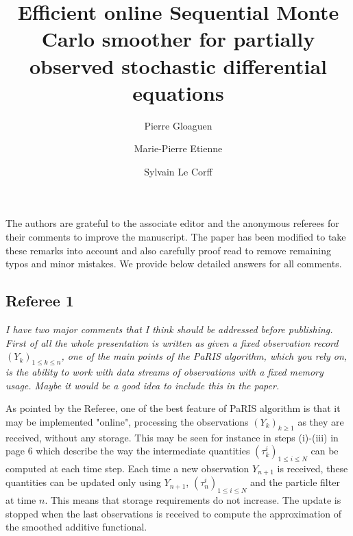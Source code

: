 \documentclass[12pt]{article}
\newcommand{\1}{\mathrm{1}}
\begin{document}
\author{Pierre Gloaguen\footnotemark[1] \and Marie-Pierre Etienne\footnotemark[1] \and Sylvain Le {C}orff\footnotemark[2]}
 


\title{Efficient online Sequential Monte Carlo smoother for partially observed stochastic differential equations}


\maketitle

The authors are grateful to the associate editor and the anonymous referees for their comments to improve the manuscript. The paper has been modified to take these remarks into account and also carefully proof read to remove remaining typos and minor mistakes. We provide below detailed answers for all comments.

\subsection*{Referee 1}
{\em I have two major comments that I think should be addressed before publishing. First of all the whole presentation is written as given a  fixed observation record $(Y_k)_{1\le k \le n}$, one of the main points of the PaRIS algorithm, which you rely on, is the ability to work with data streams of observations with a  fixed memory usage. Maybe it would be a good idea to include this in the paper.}

\vspace{.3cm}

As pointed by the Referee, one of the best feature of PaRIS algorithm is that it may be implemented "online", processing the observations $(Y_k)_{k\ge 1}$ as they are received, without any storage. This may be seen for instance in steps (i)-(iii) in page 6 which describe the way the intermediate quantities $(\tau_k^i)_{1\le i \le N}$ can be computed at each time step. Each time a new observation $Y_{n+1}$ is received, these quantities can be updated only using $Y_{n+1}$, $(\tau_n^i)_{1\le i \le N}$ and the particle filter at time $n$. This means that storage requirements do not increase. The update is stopped when the last observations is received to compute the approximation of the smoothed additive functional. 
\end{document}
